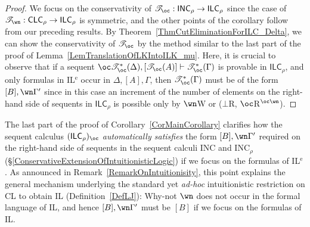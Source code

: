 \documentclass[a4paper]{article}
\theoremstyle{definition}
\theoremstyle{theorem}
\theoremstyle{remark}
\begin{document}
\begin{proof}
We focus on the conservativity of $\mathscr{T}_\oc : \textsf{INC}_\rho \rightarrow \textsf{ILC}_\rho$ since the case of $\mathscr{T}_\wn : \textsf{CLC}_\rho \rightarrow \textsf{ILC}_\rho$ is symmetric, and the other points of the corollary follow from our preceding results.
By Theorem~\ref{ThmCutEliminationForILC_Delta}, we can show the conservativity of $\mathscr{T}_\oc$ by the method similar to the last part of the proof of Lemma~\ref{LemTranslationOfLKIntoILK_mu}.
Here, it is crucial to observe that if a sequent $\oc \mathscr{T}_\oc^\ast(\Delta), [\mathscr{T}_\oc(A)] \vdash \mathscr{T}_\oc^\ast(\Gamma)$ is provable in $\textsf{ILC}_\rho$, and only formulas in IL$^{\text{e}}$ occur in $\Delta, [A], \Gamma$, then $\mathscr{T}_\oc^\ast(\Gamma)$ must be of the form $[B], \wn \Gamma'$ since in this case an increment of the number of elements on the right-hand side of sequents in $\textsf{ILC}_\rho$ is possible only by $\wn$W or ($\bot$R, $\oc$R$^{\oc\wn}$).
\end{proof}

The last part of the proof of Corollary~\ref{CorMainCorollary} clarifies how the sequent calculus $(\textsf{ILC}_\rho)_\oc$ \emph{automatically satisfies} the form $[B], \wn \Gamma'$ required on the right-hand side of sequents in the sequent calculi \textsf{INC} and \textsf{INC}$_{\rho}$ (\S\ref{ConservativeExtensionOfIntuitionisticLogic}) if we focus on the formulas of IL$^{\text{e}}$.
As announced in Remark~\ref{RemarkOnIntuitionisity}, this point explains the general mechanism underlying the standard yet \emph{ad-hoc} intuitionistic restriction on CL to obtain IL (Definition~\ref{DefLJ}): Why-not $\wn$ does not occur in the formal language of IL, and hence $[B], \wn \Gamma'$ must be $[B]$ if we focus on the formulas of IL.
\end{document}
